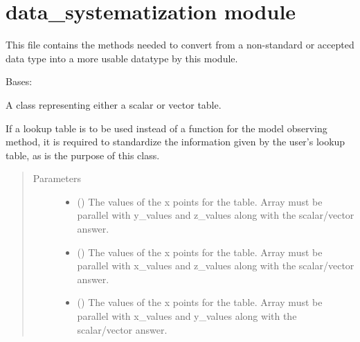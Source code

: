 \documentclass[letterpaper,10pt,english]{sphinxmanual}
\begin{document}
\section{data\_systematization module}
\label{\detokenize{data_systematization:module-data_systematization}}\label{\detokenize{data_systematization:data-systematization-module}}\label{\detokenize{data_systematization::doc}}
This file contains the methods needed to convert from a non-standard or
accepted data type into a more usable datatype by this module.

\begin{fulllineitems}
\label{\detokenize{data_systematization:data_systematization.InterpolationTable}}
Bases: 

A class representing either a scalar or vector table.

If a lookup table is to be used instead of a function for the model
observing method, it is required to standardize the information given
by the user’s lookup table, as is the purpose of this class.
\begin{quote}\begin{description}
\item[{Parameters}] \leavevmode\begin{itemize}
\item {} 
 () \textendash{} The values of the x points for the table. Array must be parallel
with y\_values and z\_values along with the scalar/vector answer.

\item {} 
 () \textendash{} The values of the x points for the table. Array must be parallel
with x\_values and z\_values along with the scalar/vector answer.

\item {} 
 () \textendash{} The values of the x points for the table. Array must be parallel
with x\_values and y\_values along with the scalar/vector answer.


\end{itemize}
\end{description}
\end{quote}
\end{fulllineitems}
\end{document}
